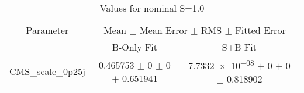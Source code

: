 \begin{table}
\centering
\caption{Values for nominal S=1.0}
\begin{tabular}{ccc}
\toprule
Parameter & \multicolumn{2}{c}{Mean $\pm$ Mean Error $\pm$ RMS $\pm$ Fitted Error}\\
 & B-Only Fit & S+B Fit\\
\midrule
CMS\_scale\_0p25j & \num{0.465753} $\pm$ \num{0} $\pm$ \num{0} $\pm$ \num{0.651941} & \num{7.7332e-08} $\pm$ \num{0} $\pm$ \num{0} $\pm$ \num{0.818902}\\
\bottomrule
\end{tabular}
\end{table}